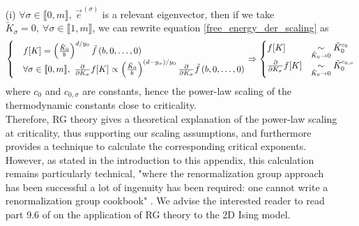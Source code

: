 \documentclass[class=report, float=false, crop=false]{standalone}
\begin{document}
\begin{itemize}
\item[(i)] $\forall \sigma \in \llbracket0,m\rrbracket,~ \vec{e}^{\hspace{1pt}(\sigma)}$ is a relevant eigenvector, then if we take $\tilde{K}_{\sigma}=0,~\forall \sigma \in \llbracket1,m\rrbracket$, we can rewrite equation \ref{free_energy_der_scaling} as
\begin{equation}
\begin{aligned}
\begin{cases} &f[K] = \left(\frac{\tilde{K}_0}{b}\right)^{d/y_0}\tilde{f}\left(b,0,\ldots,0\right) \\
&\forall \sigma \in \llbracket0,m\rrbracket,~ \frac{\partial}{\partial K_{\sigma}} f[K] \propto \left(\frac{\tilde{K}_0}{b}\right)^{(d-y_{\sigma})/y_0}\frac{\partial}{\partial K_{\sigma}}\tilde{f}\left(b,0,\ldots,0\right) \end{cases} \Rightarrow\begin{cases} f[K] &\underset{\tilde{K}_0\rightarrow0}{\sim} \tilde{K}_0^{c_0} \\ \frac{\partial}{\partial K_{\sigma}} f[K] &\underset{\tilde{K}_0\rightarrow0}{\sim} \tilde{K}_0^{c_{0,\sigma}} \end{cases}
\end{aligned}
\label{critical_exponents_RG}
\end{equation}
where $c_0$ and $c_{0,\sigma}$ are constants, hence the power-law scaling of the thermodynamic constants close to criticality.\\

Therefore, RG theory gives a theoretical explanation of the power-law scaling at criticality, thus supporting our scaling assumptions, and furthermore provides a technique to calculate the corresponding critical exponents. However, as stated in the introduction to this appendix, this calculation remains particularly technical, "where the renormalization group approach has been successful a lot of ingenuity has been required: one cannot write a renormalization group cookbook" \cite{wilson1975renormalization}. We advise the interested reader to read part 9.6 of \cite{goldenfeld1992lectures} on the application of RG theory to the 2D Ising model.\\


\end{itemize}
\end{document}
